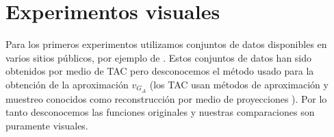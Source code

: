 


\section{Experimentos visuales}
\label{sec:experimentosVisuales}

Para los primeros experimentos utilizamos conjuntos de datos disponibles en varios sitios públicos, por ejemplo de \cite{volumeLibrary}. Estos conjuntos de datos han sido obtenidos por medio de TAC pero desconocemos el método usado para la obtención de la aproximación $v_{G_{\Delta}}$ (los TAC usan métodos de aproximación y muestreo conocidos como reconstrucción por medio de proyecciones \cite{tomografyBook}). Por lo tanto desconocemos las funciones originales y nuestras comparaciones son puramente visuales.

